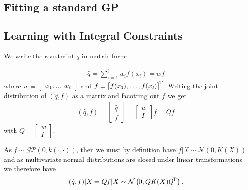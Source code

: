 \subsection{Fitting a standard GP}

\subsection{Learning with Integral Constraints}

We write the constraint $\hat{q}$ in matrix form:

\begin{align*}
  \hat{q} = \sum_{i=1}^\ell w_i f(x_i) = {w} f
\end{align*}
where $w = \begin{bmatrix} w_1, \ldots, w_\ell \end{bmatrix}$
and $f = {\begin{bmatrix} f(x_1), \ldots, f(x_\ell) \end{bmatrix}}^{\!\text{T}}$.
%
Writing the joint distribution of $(\hat{q}, f)$ as a matrix
and facotring out $f$ we get
\begin{align*}
  (\hat{q}, f)
  = \left[ \begin{array}{c} \hat{q} \\ \hline f \end{array} \right]
  = \left[ \begin{array}{c} w \\ \hline I \end{array} \right] f
  = Q f
\end{align*}
with $Q = \left[ \begin{array}{c} w \\ \hline I \end{array} \right]$.

As $f \sim \mathcal{GP}(0, k(\cdot, \cdot))$, then we must by definition have
$f | X \sim \mathcal{N}\left( 0, K(X) \right)$
and as multivariate normal distributions are closed under linear transformations
we therefore have
\begin{align*}
  (\hat{q}, f) | X
  = Q f | X
  \sim \mathcal{N}\left( 0, Q K(X) {Q}^{\!\text{T}} \right).
\end{align*}
